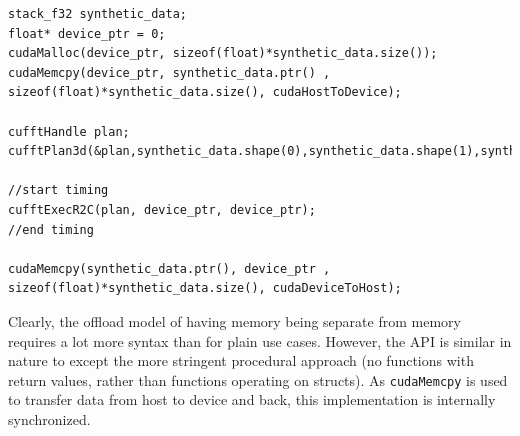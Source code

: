 \begin{lstlisting}[caption={Single FFT on synthetic data performed on GPU in pseudo-code based on the \cufft{} syntax.},label={lst:single_fft_gpu}]
stack_f32 synthetic_data;
float* device_ptr = 0;
cudaMalloc(device_ptr, sizeof(float)*synthetic_data.size());
cudaMemcpy(device_ptr, synthetic_data.ptr() , sizeof(float)*synthetic_data.size(), cudaHostToDevice);

cufftHandle plan;
cufftPlan3d(&plan,synthetic_data.shape(0),synthetic_data.shape(1),synthetic_data.shape(2),CUFFT_R2C);

//start timing
cufftExecR2C(plan, device_ptr, device_ptr);
//end timing

cudaMemcpy(synthetic_data.ptr(), device_ptr , sizeof(float)*synthetic_data.size(), cudaDeviceToHost);
\end{lstlisting}

Clearly, the offload model of having \gpu{} memory being separate from \cpu{} memory requires a lot more syntax than for plain \cpu{} use cases. However, the \cufft{} API is similar in nature to \fftw{} except the more stringent procedural approach (no functions with return values, rather than functions operating on structs). As \texttt{cudaMemcpy} is used to transfer data from host to device and back, this implementation is internally synchronized.\newline

